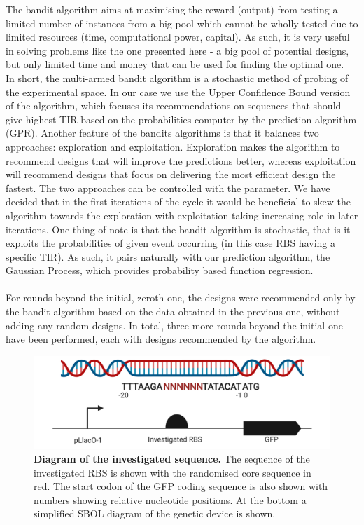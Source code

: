 \documentclass{article}
\begin{document}
The bandit algorithm aims at maximising the reward (output) from testing a limited number of instances from a big pool which cannot be wholly tested due to limited resources (time, computational power, capital). As such, it is very useful in solving problems like the one presented here - a big pool of potential designs, but only limited time and money that can be used for finding the optimal one.\\
In short, the multi-armed bandit algorithm is a stochastic method of probing of the experimental space. In our case we use the Upper Confidence Bound version of the algorithm, which focuses its recommendations on sequences that should give highest TIR based on the probabilities computer by the prediction algorithm (GPR). Another feature of the bandits algorithms is that it balances two approaches: exploration and exploitation. Exploration makes the algorithm to recommend designs that will improve the predictions better, whereas exploitation will recommend designs that focus on delivering the most efficient design the fastest. The two approaches can be controlled with the \textbeta\enspace parameter. We have decided that in the first iterations of the cycle it would be beneficial to skew the algorithm towards the exploration with exploitation taking increasing role in later iterations. One thing of note is that the bandit algorithm is stochastic, that is it exploits the probabilities of given event occurring (in this case RBS having a specific TIR). As such, it pairs naturally with our prediction algorithm, the Gaussian Process, which provides probability based function regression.\\
\\
For rounds beyond the initial, zeroth one, the designs were recommended only by the bandit algorithm based on the data obtained in the previous one, without adding any random designs. In total, three more rounds beyond the initial one have been performed, each with designs recommended by the algorithm. 

\begin{figure}[t]
    \centering
    \includegraphics[scale=0.6]{plots/RBS_anatomy.pdf}
    \caption{\textbf{Diagram of the investigated sequence.} The sequence of the investigated RBS is shown with the randomised core sequence in red. The start codon of the GFP coding sequence is also shown with numbers showing relative nucleotide positions. At the bottom a simplified SBOL diagram of the genetic device is shown.}
    \label{fig: Anatomy of the randomized sequence.}
\end{figure}
\end{document}
